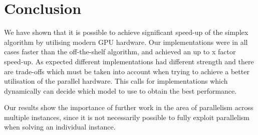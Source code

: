 \section{Conclusion}
We have shown that it is possible to achieve significant speed-up of the simplex algorithm by utilising modern GPU hardware. Our implementations were in all cases faster than the off-the-shelf algorithm, and achieved an up to x factor speed-up. As expected different implementations had different strength and there are trade-offs which must be taken into account when trying to achieve a better utilisation of the parallel hardware. This calls for implementations which dynamically can decide which model to use to obtain the best performance.

Our results show the importance of further work in the area of parallelism across multiple instances, since it is not necessarily possible to fully exploit parallelism when solving an individual instance.
